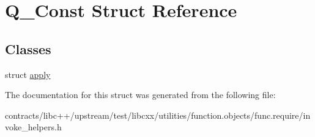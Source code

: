 \hypertarget{struct_q___const}{}\section{Q\+\_\+\+Const Struct Reference}
\label{struct_q___const}
\subsection*{Classes}
\begin{DoxyCompactItemize}
\item 
struct \mbox{\hyperlink{struct_q___const_1_1apply}{apply}}
\end{DoxyCompactItemize}


The documentation for this struct was generated from the following file\+:\begin{DoxyCompactItemize}
\item 
contracts/libc++/upstream/test/libcxx/utilities/function.\+objects/func.\+require/invoke\+\_\+helpers.\+h\end{DoxyCompactItemize}
